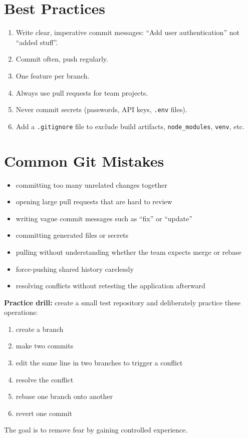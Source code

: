 \documentclass[12pt, a4paper, oneside]{book}
\begin{document}
\section{Best Practices}
\begin{enumerate}[leftmargin=2em]
    \item Write clear, imperative commit messages: ``Add user authentication'' not ``added stuff''.
    \item Commit often, push regularly.
    \item One feature per branch.
    \item Always use pull requests for team projects.
    \item Never commit secrets (passwords, API keys, \texttt{.env} files).
    \item Add a \texttt{.gitignore} file to exclude build artifacts, \texttt{node\_modules}, \texttt{venv}, etc.
\end{enumerate}

\section{Common Git Mistakes}

\begin{itemize}[leftmargin=2em]
    \item committing too many unrelated changes together
    \item opening large pull requests that are hard to review
    \item writing vague commit messages such as ``fix'' or ``update''
    \item committing generated files or secrets
    \item pulling without understanding whether the team expects merge or rebase
    \item force-pushing shared history carelessly
    \item resolving conflicts without retesting the application afterward
\end{itemize}

\begin{exercisebox}
\textbf{Practice drill:} create a small test repository and deliberately practice these operations:
\begin{enumerate}[leftmargin=2em]
    \item create a branch
    \item make two commits
    \item edit the same line in two branches to trigger a conflict
    \item resolve the conflict
    \item rebase one branch onto another
    \item revert one commit
\end{enumerate}
The goal is to remove fear by gaining controlled experience.
\end{exercisebox}
\end{document}
